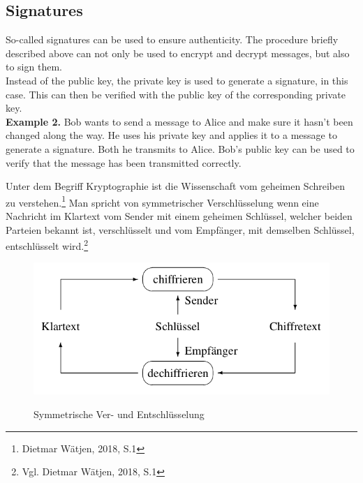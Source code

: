 {		\subsection{Signatures}
		So-called signatures can be used to ensure authenticity. The procedure briefly described above can not only be used to encrypt and decrypt messages, but also to sign them.\\
		Instead of the public key, the private key is used to generate a signature, in this case. This can then be verified with the public key of the corresponding private key.\\
		\textbf{Example 2.} Bob wants to send a message to Alice and make sure it hasn't been changed along the way. He uses his private key and applies it to a message to generate a signature. Both he transmits to Alice. Bob's public key can be used to verify that the message has been transmitted correctly.
	}{
		\glqq Unter dem Begriff Kryptographie ist die Wissenschaft vom geheimen Schreiben zu verstehen\grqq.\footnote{Dietmar Wätjen, 2018, S.1} Man spricht von symmetrischer Verschlüsselung wenn eine Nachricht im Klartext vom Sender mit einem geheimen Schlüssel, welcher beiden Parteien bekannt ist, verschlüsselt und vom Empfänger, mit demselben Schlüssel, entschlüsselt wird.\footnote{Vgl. Dietmar Wätjen, 2018, S.1}\\
		\begin{figure}[h]
			\begin{minipage}{\textwidth}
				\centering
				\includegraphics[scale=0.5]{figures/ver-und-entschluesseln.png}
				\label{ver-und-entschluesselung}
				\caption{Symmetrische Ver- und Entschlüsselung}
			\end{minipage}
		\end{figure}	
}
